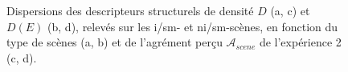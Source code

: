 \begin{figure}[t]
        \myfloatalign
        \par
       \caption{Dispersions  des descripteurs structurels de densité $D$ (a, c) et $D(E)$ (b, d), relevés sur les i/sm- et ni/sm-scènes, en fonction du type de scènes (a, b) et de l'agrément perçu $\mathcal{A}_{scene}$ de l'expérience 2 (c, d).}\label{fig:densitySansMarker}
\end{figure}

